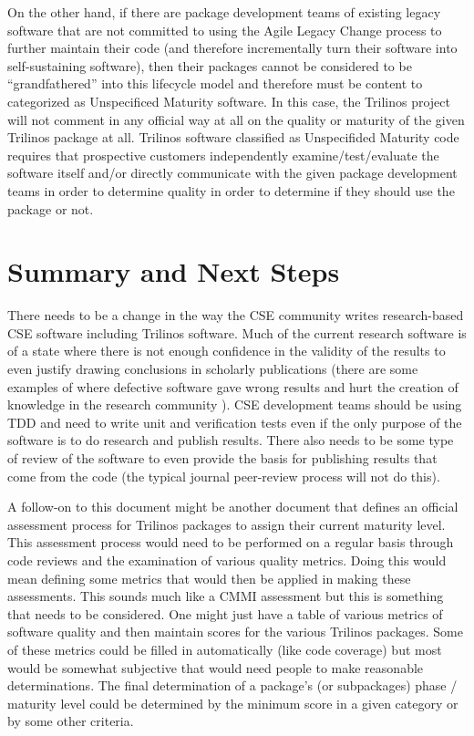 \documentclass[11pt]{SANDreport}
\begin{document}
On the other hand, if there are package development teams of existing
legacy software that are not committed to using the Agile Legacy
Change process to further maintain their code (and therefore
incrementally turn their software into self-sustaining software), then
their packages cannot be considered to be ``grandfathered'' into this
lifecycle model and therefore must be content to categorized as
Unspecificed Maturity software.  In this case, the Trilinos project
will not comment in any official way at all on the quality or maturity
of the given Trilinos package at all.  Trilinos software classified as
Unspecifided Maturity code requires that prospective customers
independently examine/test/evaluate the software itself and/or
directly communicate with the given package development teams in order
to determine quality in order to determine if they should use the
package or not.


%
{}\section{Summary and Next Steps}
\label{sec:summary_next_steps}
%

There needs to be a change in the way the CSE community writes
research-based CSE software including Trilinos software.  Much of the
current research software is of a state where there is not enough
confidence in the validity of the results to even justify drawing
conclusions in scholarly publications (there are some examples of
where defective software gave wrong results and hurt the creation of
knowledge in the research community
{}\cite{ScientistsNightmareFiveRetractions2006}).  CSE development
teams should be using TDD and need to write unit and verification
tests even if the only purpose of the software is to do research and
publish results.  There also needs to be some type of review of the
software to even provide the basis for publishing results that come
from the code (the typical journal peer-review process will not do
this).

A follow-on to this document might be another document that defines an
official assessment process for Trilinos packages to assign their
current maturity level.  This assessment process would need to be
performed on a regular basis through code reviews and the examination
of various quality metrics.  Doing this would mean defining some
metrics that would then be applied in making these assessments. This
sounds much like a CMMI assessment but this is something that needs to
be considered.  One might just have a table of various metrics of
software quality and then maintain scores for the various Trilinos
packages.  Some of these metrics could be filled in automatically
(like code coverage) but most would be somewhat subjective that would
need people to make reasonable determinations.  The final
determination of a package's (or subpackages) phase / maturity level
could be determined by the minimum score in a given category or by
some other criteria.
\end{document}
